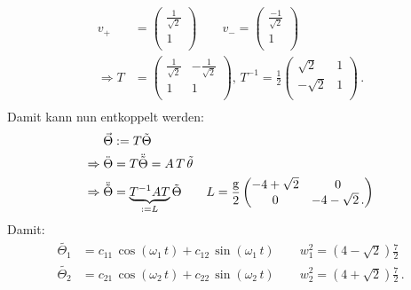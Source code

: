 \begin{equation}
	\begin{split}
		v_+ &=
		\begin{pmatrix}
			\frac{1}{\sqrt{2}} \\
			1 \\
		\end{pmatrix}
		\qquad
		v_- =
		\begin{pmatrix}
			\frac{-1}{\sqrt{2}} \\
			1 \\
		\end{pmatrix} \\
		\Rightarrow T &=
		\begin{pmatrix}
				\frac{1}{\sqrt{2}} & -\frac{1}{\sqrt{2}} \\
				1 & 1 \\
		\end{pmatrix},\,
		T^{-1} = \frac{1}{2}
		\begin{pmatrix}
				\sqrt{2} & 1 \\
				-\sqrt{2} & 1 \\
		\end{pmatrix}\, . \\
	\end{split}
	\label{eqn:T}
\end{equation}
Damit kann nun entkoppelt werden:
\begin{equation*}
	\begin{split}
		\vec{\Theta} &:= T \tilde{\Theta} \\
		\Rightarrow \ddot{\Theta} &= T \ddot{\tilde{\Theta}} = A\,T\,\tilde{\theta} \\
		\Rightarrow \ddot{\tilde{\Theta}} &= \underbrace{T^{-1} A T}_{:=L} \tilde{\Theta}
		\qquad L =\frac{\textup{g}}{2}
		\begin{pmatrix}
			-4+\sqrt{2} & 0 \\
			0 & -4-\sqrt{2} \,. \\		
		\end{pmatrix}
	\end{split}
\end{equation*}
Damit:
\begin{equation*}
	\begin{split}
		\tilde{\Theta_1} &= c_{11}\,\cos(\omega_1\,t)+c_{12}\,\sin(\omega_1\,t) \qquad w_1^2 = (4-\sqrt{2})\frac{7}{2} \\
		\tilde{\Theta_2} &= c_{21}\,\cos(\omega_2\,t)+c_{22}\,\sin(\omega_2\,t) \qquad w_2^2 = (4+\sqrt{2})\frac{7}{2} \, . \\
	\end{split}
\end{equation*}
